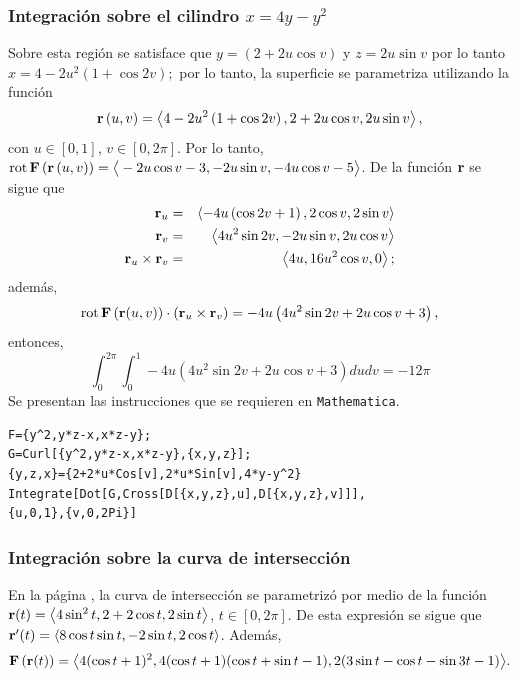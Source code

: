 \subsubsection{Integración sobre el cilindro \texorpdfstring{$x=4y-y^{2}$}{x=4y-y^2}}

Sobre esta región se satisface que
$y= (2+2u\cos v)$ y $z=2u\sin v$ por lo tanto $x=4-2u^{2}\left( 1+\cos 2v\right);$
por lo tanto, la superficie se parametriza utilizando la función
\[{\bf r}\left( u,v\right) =\left\langle 4-2u^{2}\left( 1+\cos 2v\right) ,2+2u\cos v,2u\sin v\right\rangle,\]
con $u\in[0,1],\, v\in [0,2\pi]$.
Por lo tanto, $\operatorname{rot}{\bf F}\left({\bf r}\left( u,v\right)\right) =\big \langle -2u\cos v-3,-2u\sin v,-4u\cos v-5\big \rangle$.
De la función ${\bf r}$ se sigue que
\begin{eqnarray*}
{\bf r}_{u} &=& \left\langle -4u\left( \cos 2v+1\right) ,2\cos v,2\sin v\right\rangle \\
{\bf r}_{v}&=& \left\langle 4u^{2}\sin 2v,-2u\sin v,2u\cos v\right\rangle \\
{\bf r}_{u}\times {\bf r}_{v}&=& \left\langle 4u,16u^{2}\cos v,0\right\rangle;
\end{eqnarray*}
además, \[\operatorname{rot}{\bf F}\left({\bf r}(u,v) \right)\cdot\left({\bf r}_{u}\times {\bf r}_{v}\right)= -4u\left( 4u^{2}\sin 2v+2u\cos v+3\right),\]
entonces,
\begin{equation}\label{stokes7}
\int_{0}^{2\pi }\int_{0}^{1}-4u\left( 4u^{2}\sin 2v+2u\cos v+3\right)dudv= -12\pi
\end{equation}
Se presentan las instrucciones que se requieren en \verb"Mathematica".

\begin{tcolorbox}[title=\bf Instrucción \verb"Mathematica"]\begin{Verbatim}[formatcom=\letraverbatim]
F={y^2,y*z-x,x*z-y};
G=Curl[{y^2,y*z-x,x*z-y},{x,y,z}];
{y,z,x}={2+2*u*Cos[v],2*u*Sin[v],4*y-y^2}
Integrate[Dot[G,Cross[D[{x,y,z},u],D[{x,y,z},v]]],
{u,0,1},{v,0,2Pi}]
\end{Verbatim}
\end{tcolorbox}

\subsubsection{Integración sobre la curva de intersección}

En la página \pageref{curvas3}, la curva de intersección se parametrizó  por medio de la función ${\bf r}(t)=\left\langle 4\sin ^{2}t,2+2\cos t,2\sin t\right\rangle$, $t \in [0,2\pi]$.
De esta expresión se sigue que
${\bf r}^{\prime}(t)  = \left\langle 8\cos t\sin t,-2\sin t,2\cos t\right\rangle$. Además,
\begin{gather*}
{\bf F}\left({\bf r}(t) \right) =  \big \langle 4(\cos t+1) ^{2},4(\cos t+1)(\cos t+\sin t-1), 2(3\sin t-\cos t-\sin 3t-1) \big \rangle.
\end{gather*}

